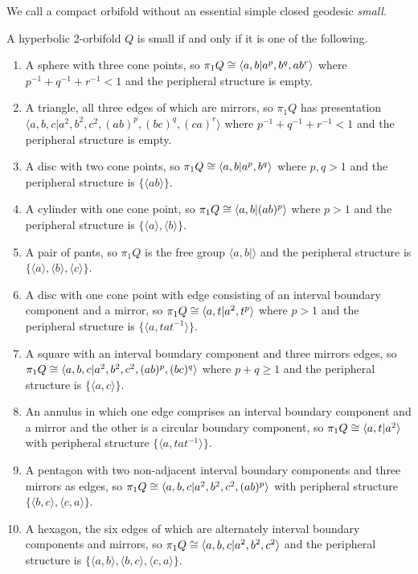 \begin{defn} We call a compact orbifold without an essential simple closed geodesic 
\emph{small}.\end{defn}

\begin{prop}\cite[Proposition 5.12]{guirardellevitt16}\label{prop:characterisationofsmall}
A hyperbolic 2-orbifold $Q$ is small if and only if it is one of the following. 
\begin{enumerate}
  \item A sphere with three cone points, so $\pi_1Q \cong \langle a, b \vert
    a^p, b^q, ab^r\rangle$ where $p^{-1}+q^{-1}+r^{-1} < 1$ and the peripheral
    structure is empty.
  \item A triangle, all three edges of which are mirrors, so $\pi_1Q$ has
    presentation $\langle a, b, c \vert a^2, b^2, c^2, (ab)^p, (bc)^q,
    (ca)^r\rangle$ where $p^{-1}+q^{-1}+r^{-1} < 1$ and the peripheral
    structure is empty.
  \item A disc with two cone points, so $\pi_1Q \cong \langle a, b \vert a^p,
    b^q\rangle$ where $p, q > 1$ and the peripheral structure is $\{\langle
    ab\rangle\}$.
  \item A cylinder with one cone point, so $\pi_1Q \cong \langle a, b \vert
    (ab)^p\rangle$ where $p >1$ and the peripheral structure is $\{\langle
    a\rangle, \langle b\rangle\}$.
  \item A pair of pants, so $\pi_1Q$ is the free group $\langle a, b
    \vert\rangle$ and the peripheral structure is $\{\langle a\rangle, \langle
    b\rangle, \langle c\rangle\}$.
  \item A disc with one cone point with edge consisting of an interval boundary
    component and a mirror, so $\pi_1Q \cong \langle a, t \vert a^2,
    t^p\rangle$ where $p > 1$ and the peripheral structure is $\{\langle a,
    tat^{-1}\rangle\}$.
  \item A square with an interval boundary component and three mirrors edges,
    so $\pi_1Q \cong \langle a, b, c\vert a^2, b^2, c^2, (ab)^p, (bc)^q\rangle$
    where $p + q \geq 1$ and the peripheral structure is $\{\langle a,
    c\rangle\}$.
  \item An annulus in which one edge comprises an interval boundary component and a
    mirror and the other is a circular boundary component, so $\pi_1Q \cong
    \langle a, t \vert a^2\rangle$ with peripheral structure $\{\langle a,
    tat^{-1}\rangle\}$.
  \item A pentagon with two non-adjacent interval boundary components and three
    mirrors as edges, so $\pi_1Q \cong \langle a, b, c \vert a^2, b^2, c^2,
    (ab)^p\rangle$ with peripheral structure $\{\langle b, c\rangle, \langle c,
    a\rangle\}$.
  \item A hexagon, the six edges of which are alternately interval boundary
    components and mirrors, so $\pi_1Q \cong \langle a, b, c \vert a^2, b^2,
    c^2\rangle$ and the peripheral structure is $\{\langle a, b\rangle, \langle
    b, c\rangle, \langle c, a\rangle\}$.
\end{enumerate}
\end{prop}

